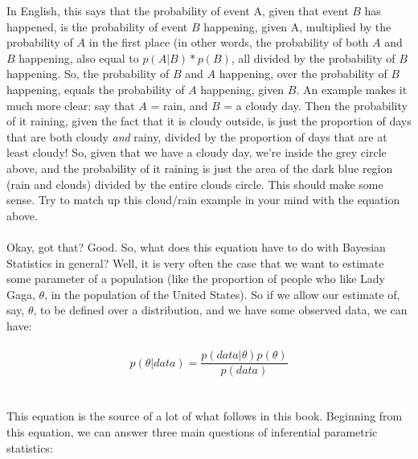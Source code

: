 \documentclass[12pt]{book}
\begin{document}
\begin{center}
    \end{center}
    

In English, this says that the probability of event A, given that event $B$ has happened, is the probability of event $B$ happening, given A, multiplied by the probability of $A$ in the first place (in other words, the probability of both $A$ and $B$ happening, also equal to $p(A|B)*p(B)$, all divided by the probability of $B$ happening. So, the probability of $B$ and $A$ happening, over the probability of $B$ happening, equals the probability of $A$ happening, given $B$. An example makes it much more clear: say that $A$ = rain, and $B$ = a cloudy day. Then the probability of it raining, given the fact that it is cloudy outside, is just the proportion of days that are both cloudy \textit{and} rainy, divided by the proportion of days that are at least cloudy! So, given that we have a cloudy day, we're inside the grey circle above, and the probability of it raining is just the area of the dark blue region (rain and clouds) divided by the entire clouds circle. This should make some sense. Try to match up this cloud/rain example in your mind with the equation above. 
\\\\
Okay, got that? Good. So, what does this equation have to do with Bayesian Statistics in general? Well, it is very often the case that we want to estimate some parameter of a population (like the proportion of people who like Lady Gaga, $\theta$, in the population of the United States). So if we allow our estimate of, say, $\theta$, to be defined over a distribution, and we have some observed data, we can have: 
\\\\
\begin{equation}
p( \theta |data) = \frac{p(data|\theta)p(\theta)}{p(data)}
\end{equation}
\\\\
This equation is the source of a lot of what follows in this book. Beginning from this equation, we can answer three main questions of inferential parametric statistics:\\
\end{document}
